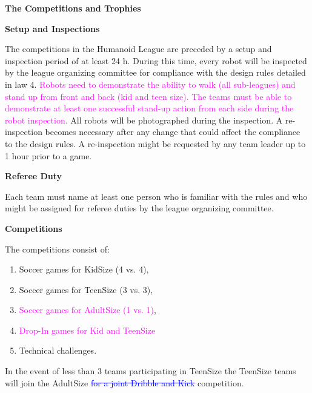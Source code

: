 \clearpage
\sffamily
{\bfseries\color[rgb]{0.4,0.4,0.4}The Competitions and Trophies}

\bigskip

{\bfseries Setup and Inspections}

\headlinebox

The competitions in the Humanoid League are preceded by a setup and inspection period of at least 24 h. During this time, every robot will be inspected by the league organizing committee for compliance with the design rules detailed in law 4. \textcolor{magenta}{Robots need to demonstrate the ability to walk (all sub-leagues) and stand up from front and back (kid and teen size). The teams must be able to demonstrate at least one successful stand-up action from each side during the robot inspection.} All robots will be photographed during the inspection. A re-inspection becomes necessary after any change that could affect the compliance to the design rules. A re-inspection might be requested by any team leader up to 1 hour prior to a game.

\bigskip

{\bfseries Referee Duty}

\headlinebox

Each team must name at least one person who is familiar with the rules and who might be assigned for referee duties by the league organizing committee.

\bigskip

{\bfseries Competitions}

\headlinebox

The competitions consist of:

\begin{enumerate}
\item Soccer games for KidSize (4 vs. 4),
\item Soccer games for TeenSize (3 vs. 3),
\item \textcolor{magenta}{Soccer games for AdultSize (1 vs. 1)},
\item \textcolor{magenta}{Drop-In games for Kid and TeenSize}
\item Technical challenges.
\end{enumerate}

\bigskip

In the event of less than 3 teams participating in TeenSize the TeenSize teams will join the AdultSize  \textcolor{blue}{\sout{for a joint Dribble and Kick}} competition.

\bigskip

